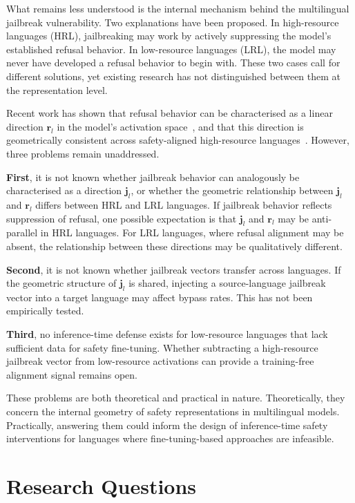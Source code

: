 What remains less understood is the internal mechanism behind the multilingual jailbreak vulnerability. Two explanations have been proposed. In high-resource languages (HRL), jailbreaking may work by actively suppressing the model's established refusal behavior. In low-resource languages (LRL), the model may never have developed a refusal behavior to begin with. These two cases call for different solutions, yet existing research has not distinguished between them at the representation level.

Recent work has shown that refusal behavior can be characterised as a linear direction $\mathbf{r}_l$ in the model's activation space~\citep{arditi2024refusal}, and that this direction is geometrically consistent across safety-aligned high-resource languages~\citep{wang2026refusal}. However, three problems remain unaddressed.

\textbf{First}, it is not known whether jailbreak behavior can analogously be characterised as a direction $\mathbf{j}_l$, or whether the geometric relationship between $\mathbf{j}_l$ and $\mathbf{r}_l$ differs between HRL and LRL languages. If jailbreak behavior reflects suppression of refusal, one possible expectation is that $\mathbf{j}_l$ and $\mathbf{r}_l$ may be anti-parallel in HRL languages. For LRL languages, where refusal alignment may be absent, the relationship between these directions may be qualitatively different.

\textbf{Second}, it is not known whether jailbreak vectors transfer across languages. If the geometric structure of $\mathbf{j}_l$ is shared, injecting a source-language jailbreak vector into a target language may affect bypass rates. This has not been empirically tested.

\textbf{Third}, no inference-time defense exists for low-resource languages that lack sufficient data for safety fine-tuning. Whether subtracting a high-resource jailbreak vector from low-resource activations can provide a training-free alignment signal remains open.

These problems are both theoretical and practical in nature. Theoretically, they concern the internal geometry of safety representations in multilingual models. Practically, answering them could inform the design of inference-time safety interventions for languages where fine-tuning-based approaches are infeasible.

\section{Research Questions}
\label{sec:rq}

